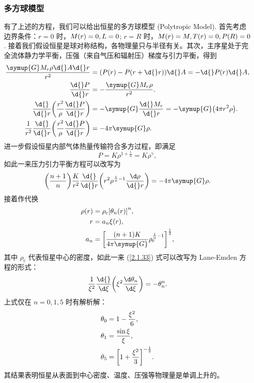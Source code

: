 \documentclass[../天体物理基础.tex]{subfiles}
\begin{document}
\subsubsection{多方球模型}
有了上述的方程，我们可以给出恒星的多方球模型 (Polytropic Model). 首先考虑边界条件：$r=0$ 时，$M\mleft(r\mright)=0, L=0$; $r=R$ 时，$M\mleft(r\mright)=M, T\mleft(r\mright)=0, P\mleft(R\mright)=0$. 接着我们假设恒星是球对称结构，各物理量只与半径有关。其次，主序星处于完全流体静力学平衡，压强（来自气压和辐射压）梯度与引力平衡，得到
\begin{align}
\frac{\symup{G}M_{r}\rho\d{}A\d{}r}{r^{2}}&=\mleft(P\mleft(r\mright)-P\mleft(r+\d{}r\mright)\mright)\d{}A=-\d{}P\mleft(r\mright)\d{}A,\\
\frac{\d{}P}{\d{}r}&=-\frac{\symup{G}M_{r}\rho}{r^{2}}.\\
\frac{\d{}}{\d{}r}\mleft(\frac{r^{2}}{\rho}\frac{\d{}P}{\d{}r}\mright)&=-\symup{G}\frac{\d{}M_{r}}{\d{}r}=-\symup{G}\mleft(4\pi r^{2}\rho\mright).\\
\frac{1}{r^{2}}\frac{\d{}}{\d{}r}\mleft(\frac{r^{2}}{\rho}\frac{\d{}P}{\d{}r}\mright)&=-4\pi\symup{G}\rho.
\end{align}
进一步假设恒星内部气体热量传输符合多方过程，即满足
\begin{equation}
P=K\rho^{1+\frac{1}{n}}=K\rho^{\gamma},
\end{equation}
如此一来压力引力平衡方程可以改写为
\begin{equation}
\mleft(\frac{n+1}{n}\mright)\frac{K}{r^{2}}\frac{\d{}}{\d{}r}\mleft(r^{2}\rho^{\frac{1}{n}-1}\frac{\d\rho}{\d{}r}\mright)=-4\pi\symup{G}\rho.\label{2.1.33}
\end{equation}
接着作代换
\begin{align}
\rho\mleft(r\mright)&=\rho_{\mathrm{c}}\mleft[\theta_{n}\mleft(r\mright)\mright]^{n},\\
r&=a_{n}\xi\mleft(r\mright),\\
a_{n}&=\mleft[\frac{\mleft(n+1\mright) K}{4\pi\symup{G}}\rho_{\mathrm{c}}^{\frac{1}{n}-1}\mright]^{\frac{1}{2}},\label{2.1.86}
\end{align}
其中 $\rho_{\mathrm{c}}$ 代表恒星中心的密度，如此一来 (\ref{2.1.33}) 式可以改写为 Lane-Emden 方程的形式：
\begin{equation}
\frac{1}{\xi^{2}}\frac{\d{}}{\d\xi}\mleft(\xi^{2}\frac{\d\theta_{n}}{\d\xi}\mright)=-\theta_{n}^{n}.
\end{equation}
上式仅在 $n=0, 1, 5$ 时有解析解：
\begin{align}
\theta_{0}&=1-\frac{\xi^{2}}{6},\\
\theta_{1}&=\frac{\sin{\xi}}{\xi},\\
\theta_{5}&=\mleft[1+\frac{\xi^{2}}{3}\mright]^{-\frac{1}{2}}.
\end{align}
其结果表明恒星从表面到中心密度、温度、压强等物理量是单调上升的。
\end{document}
